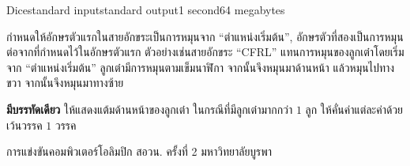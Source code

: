 \documentclass[11pt,a4paper]{article}
\begin{document}
\begin{problem}{Dice}{standard input}{standard output}{1 second}{64 megabytes}
\begin{itemize}
\end{itemize}

กำหนดให้อักษรตัวแรกในสายอักขระเป็นการหมุนจาก “ตำแหน่งเริ่มต้น”, อักษรตัวที่สองเป็นการหมุนต่อจากที่กำหนดไว้ในอักษรตัวแรก ตัวอย่างเช่นสายอักขระ “CFRL” แทนการหมุนของลูกเต๋าโดยเริ่มจาก “ตำแหน่งเริ่มต้น” ลูกเต๋ามีการหมุนตามเข็มนาฬิกา จากนั้นจึงหมุนมาด้านหน้า แล้วหมุนไปทางขวา จากนั้นจึงหมุนมาทางซ้าย

\OutputFile

\textbf{มีบรรทัดเดียว} ให้แสดงแต้มด้านหน้าของลูกเต๋า ในกรณีที่มีลูกเต๋ามากกว่า $1$ ลูก ให้คั่นค่าแต่ละค่าด้วยเว้นวรรค $1$ วรรค


\Examples

\begin{example}
%
\end{example}

\Source

การแข่งขันคอมพิวเตอร์โอลิมปิก สอวน. ครั้งที่ 2 มหาวิทยาลัยบูรพา

\end{problem}
\end{document}
